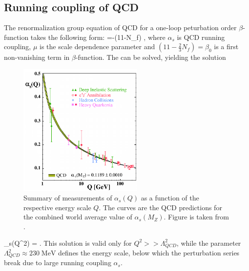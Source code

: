 	\subsection*{Running coupling of QCD}
The renormalization group equation of QCD for a one-loop peturbation order $\beta$-function takes the following form:
\beqa
    \label{qcd_low:renorm_eq}
	\mu{}=-(11-N_f) \;,
\eeqa
where $\alpha_s$ is QCD running coupling, $\mu$ is the scale dependence parameter and $(11-\frac{2}{3}N_f) = \beta_0$ is a first non-vanishing term in $\beta$-function. The \Eq{\ref{qcd_low:renorm_eq}} can be solved, yielding the solution
\begin{figure}[h]
 \begin{center}
  \includegraphics[width=0.55\textwidth]{figures/running_coupling2.png}
 \end{center}
 \caption{\footnotesize 
Summary of measurements of $\alpha_s(Q)$ as a function of the respective energy scale $Q$.
The curves are the QCD predictions for the combined world average value of $\alpha_s(M_Z)$. Figure is taken from \cite{Bethke:2006ac}.
}
\label{fig:running_coupling} 
\end{figure}
\beqa
	\alpha_s(Q^2) = \;.
\eeqa
This solution is valid only for $Q^2 >> \Lambda^2_{QCD}$, while the parameter $\Lambda^2_{QCD} \approx 230 \; \text{MeV}$ defines the energy scale,
below which the perturbation series break due to large running coupling $\alpha_s$. 

